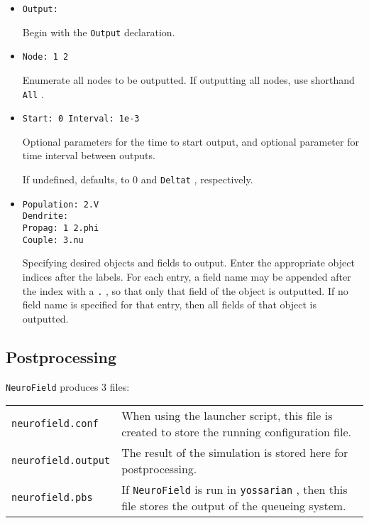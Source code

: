 \documentclass[12pt,a4paper]{article}
\newcommand{\type}[1]{ {\small\small\tt #1} }
\newcommand{\NF}[0]{ \type{NeuroField}}
\begin{document}
\begin{itemize}
	\item \begin{lstlisting}
Output:
		\end{lstlisting}
Begin with the \type{Output} declaration.
\item \begin{lstlisting}
Node: 1 2
\end{lstlisting}
Enumerate all nodes to be outputted. If outputting all nodes, use shorthand \type{All}.
\item \begin{lstlisting}
Start: 0 Interval: 1e-3
\end{lstlisting}
Optional parameters for the time to start output, and optional parameter for time interval between outputs.

If undefined, defaults, to 0 and \type{Deltat}, respectively.
\item \begin{lstlisting}
Population: 2.V
Dendrite:
Propag: 1 2.phi
Couple: 3.nu
\end{lstlisting}
Specifying desired objects and fields to output. Enter the appropriate object indices after the labels. For each entry, a field name may be appended after the index with a \type{.}, so that only that field of the object is outputted. If no field name is specified for that entry, then all fields of that object is outputted.
\end{itemize}

\subsection{Postprocessing}

\NF produces 3 files:

\begin{tabular}{l p{11.5cm}}
\type{neurofield.conf}& When using the launcher script, this file is created to store the running configuration file.\\
\type{neurofield.output}& The result of the simulation is stored here for postprocessing.\\
\type{neurofield.pbs}& If \NF is run in \type{yossarian}, then this file stores the output of the queueing system.
\end{tabular}
\end{document}
